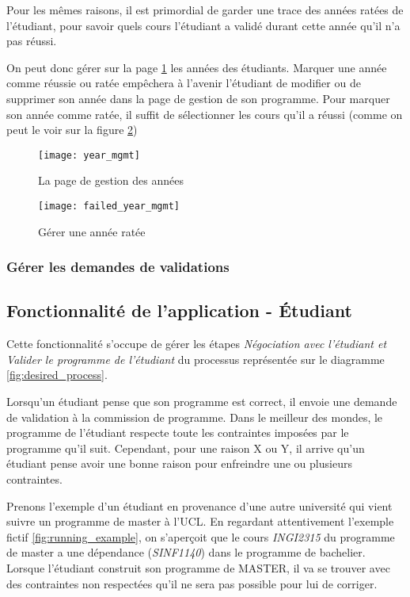 Pour les mêmes raisons, il est primordial de garder une trace des années ratées de l'étudiant, pour savoir quels cours l'étudiant a validé durant cette année qu'il n'a pas réussi.

On peut donc gérer sur la page \ref{fig:year_mgmt} les années des étudiants. Marquer une année comme réussie ou ratée empêchera à l'avenir l'étudiant de modifier ou de supprimer son année dans la page de gestion de son programme. Pour marquer son année comme ratée, il suffit de sélectionner les cours qu'il a réussi (comme on peut le voir sur la figure \ref{fig:failed_year_mgmt})
\begin{figure}
\centering
\caption{La page de gestion des années}
\label{fig:year_mgmt}
\texttt{[image: year\_mgmt]}
\end{figure}

\begin{figure}
\centering
\caption{Gérer une année ratée}
\label{fig:failed_year_mgmt}
\texttt{[image: failed\_year\_mgmt]}
\end{figure}


\subsubsection{Gérer les demandes de validations}
\subsection{Fonctionnalité de l'application - Étudiant}

Cette fonctionnalité s'occupe de gérer les étapes \textit{Négociation avec l'étudiant et Valider le programme de l'étudiant} du processus représentée sur le diagramme \ref{fig:desired_process}. 

Lorsqu'un étudiant pense que son programme est correct, il envoie une demande de validation à la commission de programme. Dans le meilleur des mondes, le programme de l'étudiant respecte toute les contraintes imposées par le programme qu'il suit. Cependant, pour une raison X ou Y, il arrive qu'un étudiant pense avoir une bonne raison pour enfreindre une ou plusieurs contraintes.

Prenons l'exemple d'un étudiant en provenance d'une autre université qui vient suivre un programme de master à l'UCL. En regardant attentivement l'exemple fictif \ref{fig:running_example}, on s’aperçoit que le cours \textit{INGI2315} du programme de master a une dépendance (\textit{SINF1140}) dans le programme de bachelier. Lorsque l'étudiant construit son programme de MASTER, il va se trouver avec des contraintes non respectées qu'il ne sera pas possible pour lui de corriger. 


